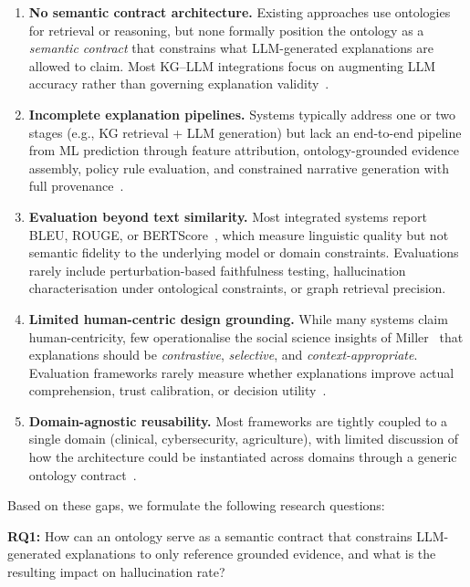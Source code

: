 \documentclass[lnbip]{svmultln}
\begin{document}
\begin{enumerate}
    \item \textbf{No semantic contract architecture.} Existing approaches use ontologies for retrieval or reasoning, but none formally position the ontology as a \emph{semantic contract} that constrains what LLM-generated explanations are allowed to claim. Most KG--LLM integrations focus on augmenting LLM accuracy rather than governing explanation validity~\cite{synkg2025,hybridkg2025}.

    \item \textbf{Incomplete explanation pipelines.} Systems typically address one or two stages (e.g., KG retrieval + LLM generation) but lack an end-to-end pipeline from ML prediction through feature attribution, ontology-grounded evidence assembly, policy rule evaluation, and constrained narrative generation with full provenance~\cite{threat2025,sop2025}.

    \item \textbf{Evaluation beyond text similarity.} Most integrated systems report BLEU, ROUGE, or BERTScore~\cite{gdm2026,medsum2026,medkgcot2025}, which measure linguistic quality but not semantic fidelity to the underlying model or domain constraints. Evaluations rarely include perturbation-based faithfulness testing, hallucination characterisation under ontological constraints, or graph retrieval precision.

    \item \textbf{Limited human-centric design grounding.} While many systems claim human-centricity, few operationalise the social science insights of Miller~\cite{miller2019} that explanations should be \emph{contrastive}, \emph{selective}, and \emph{context-appropriate}. Evaluation frameworks rarely measure whether explanations improve actual comprehension, trust calibration, or decision utility~\cite{doshi2017,racds2026}.

    \item \textbf{Domain-agnostic reusability.} Most frameworks are tightly coupled to a single domain (clinical, cybersecurity, agriculture), with limited discussion of how the architecture could be instantiated across domains through a generic ontology contract~\cite{macds2026}.
\end{enumerate}

Based on these gaps, we formulate the following research questions:

\noindent\textbf{RQ1:} How can an ontology serve as a semantic contract that constrains LLM-generated explanations to only reference grounded evidence, and what is the resulting impact on hallucination rate?
\end{document}
